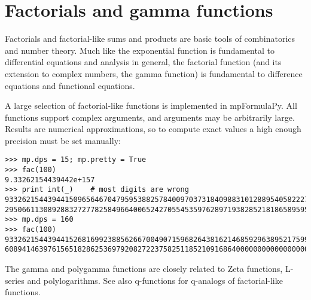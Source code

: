 
\chapter{Factorials and gamma functions}
Factorials and factorial-like sums and products are basic tools of combinatorics and number theory. Much like the exponential function is fundamental to differential equations and analysis in general, the factorial function (and its extension to complex numbers, the
gamma function) is fundamental to difference equations and functional equations.

\vpara
A large selection of factorial-like functions is implemented in mpFormulaPy. All functions support complex arguments, and arguments may be arbitrarily large. Results are numerical approximations, so to compute exact values a high enough precision must be set manually:

\begin{lstlisting}
>>> mp.dps = 15; mp.pretty = True
>>> fac(100)
9.33262154439442e+157
>>> print int(_)    # most digits are wrong
93326215443944150965646704795953882578400970373184098831012889540582227238570431
295066113089288327277825849664006524270554535976289719382852181865895959724032
>>> mp.dps = 160
>>> fac(100)
93326215443944152681699238856266700490715968264381621468592963895217599993229915
608941463976156518286253697920827223758251185210916864000000000000000000000000.0
\end{lstlisting}
The gamma and polygamma functions are closely related to Zeta functions, L-series and polylogarithms. See also q-functions for q-analogs of factorial-like functions.


